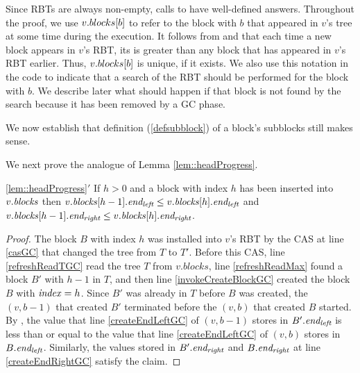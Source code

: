 Since RBTs are always non-empty, calls to  have well-defined answers.  
Throughout the proof, we use $v.blocks[b]$ to refer to the block with  $b$ that appeared
in $v$'s tree at some time during the execution.
It follows from  and  that 
each time a new block appears in $v$'s RBT, its  is greater than any block
that has appeared in $v$'s RBT earlier.
Thus, $v.blocks[b]$ is unique, if it exists.
We also use this notation in the code to indicate that a search of the RBT should be performed for the block
with  $b$.
We describe later what should happen if that block is not found by the search because it has been removed
by a GC phase.

We now establish that definition (\ref{defsubblock}) of a block's subblocks
still makes sense.


We next prove the analogue of Lemma \ref{lem::headProgress}.
\begin{customlemma}{\ref{lem::headProgress}$'$}\label{lem::headProgressGC}
 If $h>0$ and a block with index $h$ has been inserted into $v.\mbox{\textit{blocks}}$ then 
 $v.\mbox{\textit{blocks}}[h-1].\mbox{\textit{end\textsubscript{left}}} \leq v.\mbox{\textit{blocks}}[h].\mbox{\textit{end\textsubscript{left}}}$ and 
 $v.\mbox{\textit{blocks}}[h-1].\mbox{\textit{end\textsubscript{right}}} \leq v.\mbox{\textit{blocks}}[h].\mbox{\textit{end\textsubscript{right}}}$.
\end{customlemma}
\begin{proof}
The block $B$ with index $h$ was installed into $v$'s RBT by the CAS at line \ref{casGC} 
that changed the tree from $T$ to $T'$.
Before this CAS, line \ref{refreshReadTGC} read the tree $T$ from $v.blocks$,
line \ref{refreshReadMax} found a block $B'$  with  $h-1$ in $T$,
and then line \ref{invokeCreateBlockGC} created the block $B$ with $\mbox{\textit{index}}=h$.
Since $B'$ was already in $T$ before $B$ was created, the
$(v,b-1)$ that created $B'$ terminated before the 
$(v,b)$ that created $B$ started.
By , the value that line \ref{createEndLeftGC} of $(v,b-1)$ 
stores in $B'.\mbox{\textit{end\textsubscript{left}}}$ is less than or equal to the value that line \ref{createEndLeftGC} 
of $(v,b)$ stores in $B.\mbox{\textit{end\textsubscript{left}}}$.  
Similarly, the values stored in $B'.\mbox{\textit{end\textsubscript{right}}}$ and $B.\mbox{\textit{end\textsubscript{right}}}$ at line \ref{createEndRightGC} satisfy the claim.
\end{proof}

